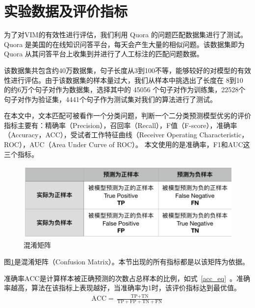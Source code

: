 \section{实验数据及评价指标}

为了对VIM的有效性进行评估，我们利用 Quora 的问题匹配数据集进行了测试。 Quora 是美国的在线知识问答平台，每天会产生大量的相似问题。该数据集即为 Quora 从其问答平台上收集到并进行了人工标注的匹配问题数据。

该数据集共包含约40万数据集，句子长度从3到100不等，能够较好的对模型的有效性进行评估。由于该数据集的样本量过大，我们从样本中挑选出了长度在 8到10 的约6万个句子对作为数据集，选择其中的 45056 个句子对作为训练集，22528个句子对作为验证集，4441个句子作为测试集对我们的算法进行了测试。


在本文中，文本匹配可被看作一个分类问题，判断一个二分类预测模型优劣的评价指标主要有：精确率（Precision），召回率（Recall），F值（F-score），准确率（Accuracy，ACC），受试者工作特征曲线（Receiver Operating Characteristic，ROC），AUC（Area Under Curve of ROC）。
本文使用的是准确率，F1和AUC这三个指标。

\begin{figure}[!htbp]
\vspace{1em}
\centering
  \includegraphics[width=0.9\linewidth]{figures/matrix}
  \caption{混淆矩阵}
  \label{fig:Con_matrix}       %
\vspace{1em}
\end{figure}

图\ref{fig:Con_matrix}是混淆矩阵（Confusion Matrix）。本节出现的所有指标都是以该矩阵为依据。

准确率$\text{ACC}$是计算样本被正确预测的次数占总样本的比例，如式~\eqref{acc_eq}~。准确率越高，算法在该指标上表现越好，当准确率为1时，该评价指标达到最优值。
\begin{equation}
\label{acc_eq}
\begin{aligned}
\text{ACC}=\frac{\text{TP}+\text{TN}}{\text{TP}+\text{FP}+\text{TN}+\text{FN}}
\end{aligned}
\end{equation}

